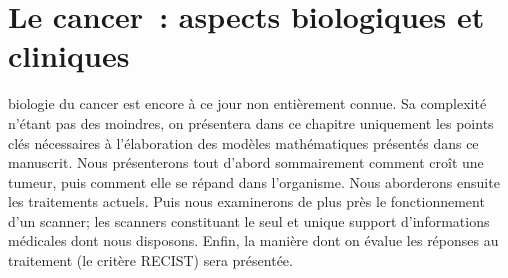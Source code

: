 \documentclass[main.tex]{subfiles}
\begin{document}
\chapter{Le cancer~: aspects biologiques et cliniques \label{chap:biologie_du_cancer}}
 biologie du cancer est encore à ce jour non entièrement connue. 
Sa complexité n'étant pas des moindres, on présentera dans ce chapitre uniquement les points clés nécessaires à l'élaboration des modèles mathématiques présentés dans ce manuscrit. 
Nous présenterons tout d'abord sommairement comment croît une tumeur, puis comment elle se répand dans l'organisme. Nous aborderons ensuite les traitements actuels. Puis nous examinerons de plus près le fonctionnement d'un scanner; les scanners constituant le seul et unique support d'informations médicales dont nous disposons. Enfin, la manière dont on évalue les réponses au traitement (le critère RECIST) sera présentée.
\end{document}
